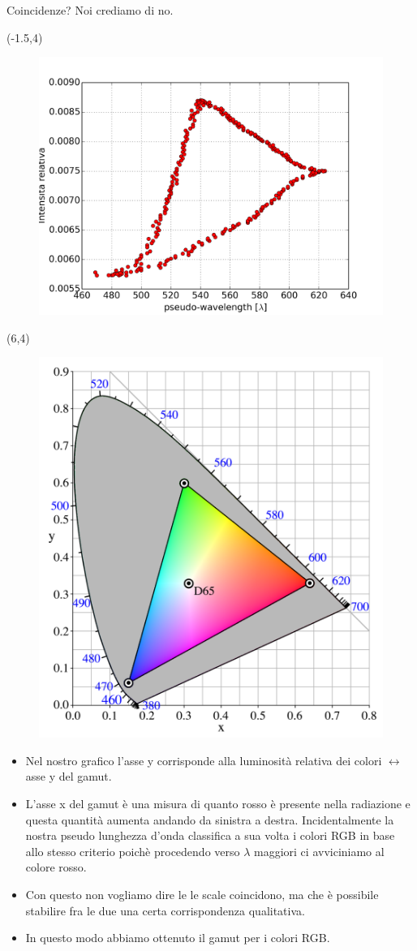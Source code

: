 \documentclass{beamer}
\begin{document}
\begin{frame}{Coincidenze? Noi crediamo di no.}

\begin{textblock}{12}(-1.5,4)
\begin{figure}
\centering
\includegraphics[width=0.7\linewidth]{./nostro_gamut}
\label{fig:nostro_gamu}
\end{figure}
\end{textblock}


\begin{textblock}{12}(6,4)
\begin{figure}
\includegraphics[width=0.45\linewidth]{./8_CIExy1931_sRGB_gamut_D65}
\end{figure}
\end{textblock}

\end{frame}

\begin{frame}
\begin{itemize}
\item Nel nostro grafico l'asse y corrisponde alla luminosità relativa dei colori $\leftrightarrow$ asse y del gamut.
\item L'asse x del gamut è una misura di quanto rosso è presente nella radiazione e questa quantità aumenta andando da sinistra a destra. Incidentalmente la nostra pseudo lunghezza d'onda classifica a sua volta i colori RGB in base allo stesso criterio poichè procedendo verso $\lambda$ maggiori ci avviciniamo al colore rosso.
\item Con questo non vogliamo dire le le scale coincidono, ma che è possibile stabilire fra le due una certa corrispondenza qualitativa.
\item In questo modo abbiamo ottenuto il gamut per i colori RGB.
\end{itemize}
\end{frame}
\end{document}
